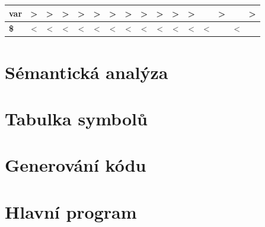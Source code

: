 \documentclass[11pt,a4paper]{article}
\renewcommand{\familydefault}{\sfdefault}
\begin{document}
\begin{table}[h!]
\begin{tabular}{|l|c|c|c|c|c|c|c|c|c|c|c|c|c|c|c|}
        \textbf{var}             & \textgreater{} & \textgreater{} & \textgreater{} & \textgreater{} & \textgreater{} & \textgreater{}       & \textgreater{}          & \textgreater{}        & \textgreater{}           & \textgreater{} & \textgreater{} &             & \textgreater{} &              & \textgreater{} \\ \hline
        \textbf{\$}              & \textless{}    & \textless{}    & \textless{}    & \textless{}    & \textless{}    & \textless{}          & \textless{}             & \textless{}           & \textless{}              & \textless{}    & \textless{}    & \textless{} &                & \textless{}  &                \\ \hline
        \end{tabular}
        \end{table}
                        
        \renewcommand{\familydefault}{\sfdefault}

    \section{Sémantická analýza}


    \section{Tabulka symbolů}


    \section{Generování kódu}
    

    \section{Hlavní program}
\end{document}
